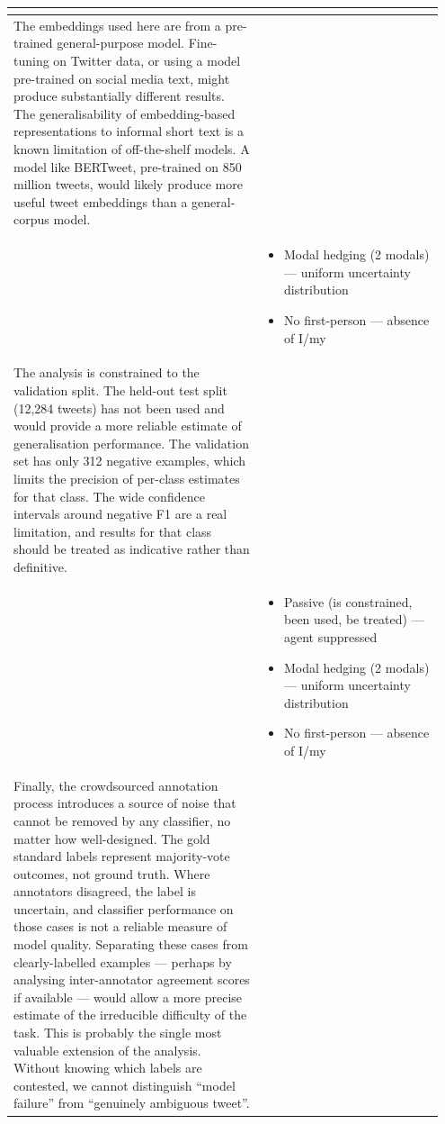 \documentclass[11pt]{article}
\begin{document}
\begin{longtable}{|p{0.55\linewidth}|p{0.40\linewidth}|}
\begin{itemize}[leftmargin=1em,itemsep=1pt,topsep=1pt,parsep=0pt]
\end{itemize} \\
\hline
The embeddings used here are from a pre-trained general-purpose model. Fine-tuning on Twitter data, or using a model pre-trained on social media text, might produce substantially different results. The generalisability of embedding-based representations to informal short text is a known limitation of off-the-shelf models. A model like BERTweet, pre-trained on 850 million tweets, would likely produce more useful tweet embeddings than a general-corpus model. & \\[2pt]
\hline
\rule[-3.5cm]{0pt}{3.5cm} & \begin{itemize}[leftmargin=1em,itemsep=1pt,topsep=1pt,parsep=0pt]
  \item Modal hedging (2 modals) --- uniform uncertainty distribution
  \item No first-person --- absence of I/my
\end{itemize} \\
\hline
The analysis is constrained to the validation split. The held-out test split (12,284 tweets) has not been used and would provide a more reliable estimate of generalisation performance. The validation set has only 312 negative examples, which limits the precision of per-class estimates for that class. The wide confidence intervals around negative F1 are a real limitation, and results for that class should be treated as indicative rather than definitive. & \\[2pt]
\hline
\rule[-3.5cm]{0pt}{3.5cm} & \begin{itemize}[leftmargin=1em,itemsep=1pt,topsep=1pt,parsep=0pt]
  \item Passive (is constrained, been used, be treated) --- agent suppressed
  \item Modal hedging (2 modals) --- uniform uncertainty distribution
  \item No first-person --- absence of I/my
\end{itemize} \\
\hline
Finally, the crowdsourced annotation process introduces a source of noise that cannot be removed by any classifier, no matter how well-designed. The gold standard labels represent majority-vote outcomes, not ground truth. Where annotators disagreed, the label is uncertain, and classifier performance on those cases is not a reliable measure of model quality. Separating these cases from clearly-labelled examples --- perhaps by analysing inter-annotator agreement scores if available --- would allow a more precise estimate of the irreducible difficulty of the task. This is probably the single most valuable extension of the analysis. Without knowing which labels are contested, we cannot distinguish ``model failure'' from ``genuinely ambiguous tweet''. & \\[2pt]

\end{longtable}
\end{document}
